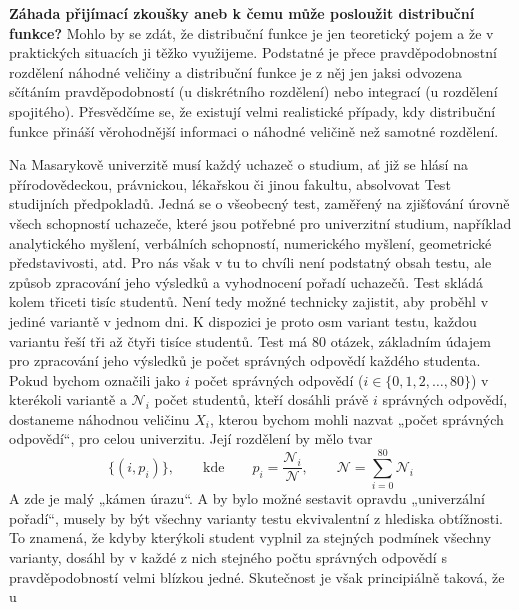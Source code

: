 \wikitextrule
\begin{example}\label{mai:exam075}
  \textbf{Záhada přijímací zkoušky aneb k čemu může posloužit distribuční funkce?}\newline\small
  Mohlo by se zdát, že distribuční funkce je jen teoretický pojem a že v praktických situacích ji 
  těžko využijeme. Podstatné je přece pravděpodobnostní rozdělení náhodné veličiny a distribuční 
  funkce je z něj jen jaksi odvozena sčítáním pravděpodobností (u diskrétního rozdělení) nebo 
  integrací (u rozdělení spojitého). Přesvědčíme se, že existují velmi realistické případy, kdy 
  distribuční funkce přináší věrohodnější informaci o náhodné veličině než samotné rozdělení.
  
  Na Masarykově univerzitě musí každý uchazeč o studium, ať již se hlásí na přírodovědeckou, 
  právnickou, lékařskou či jinou fakultu, absolvovat Test studijních předpokladů. Jedná se o 
  všeobecný test, zaměřený na zjišťování úrovně všech schopností uchazeče, které jsou potřebné pro 
  univerzitní studium, například analytického myšlení, verbálních schopností, numerického myšlení, 
  geometrické představivosti, atd. Pro nás však v tu to chvíli není podstatný obsah testu, ale 
  způsob zpracování jeho výsledků a vyhodnocení pořadí uchazečů. Test skládá kolem třiceti tisíc 
  studentů. Není tedy možné technicky zajistit, aby proběhl v jediné variantě v jednom dni.
  K dispozici je proto osm variant testu, každou variantu řeší tři až čtyři tisíce studentů. Test 
  má \num{80} otázek, základním údajem pro zpracování jeho výsledků je počet správných odpovědí 
  každého studenta. Pokud bychom označili jako \(i\) počet správných odpovědí (\(i \in\lbrace0, 1, 
  2, \ldots, 80\rbrace\)) v kterékoli variantě a \(\mathcal{N}_i\) počet studentů, kteří
  dosáhli právě \(i\) správných odpovědí, dostaneme náhodnou veličinu \(X_i\), kterou bychom mohli 
  nazvat „počet správných odpovědí“, pro celou univerzitu. Její rozdělení by mělo tvar
  \begin{equation*}
    \lbrace(i,p_i)\rbrace,\qquad\text{kde}\qquad p_i = \dfrac{\mathcal{N}_i}{\mathcal{N}}, \qquad
    \mathcal{N} = \sum_{i=0}^{80}\mathcal{N}_i
  \end{equation*}
  A zde je malý „kámen úrazu“. A by bylo možné sestavit opravdu „univerzální pořadí“, musely by být 
  všechny varianty testu ekvivalentní z hlediska obtížnosti. To znamená, že kdyby kterýkoli student 
  vyplnil za stejných podmínek všechny varianty, dosáhl by v každé z nich stejného počtu správných 
  odpovědí s pravděpodobností velmi blízkou jedné. Skutečnost je však principiálně taková, že u 

\end{example}
